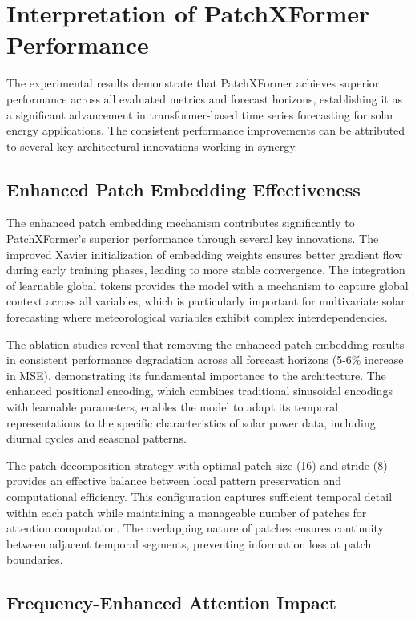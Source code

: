 \documentclass[12pt]{uomthesis}
\begin{document}
\section{Interpretation of PatchXFormer Performance}

The experimental results demonstrate that PatchXFormer achieves superior performance across all evaluated metrics and forecast horizons, establishing it as a significant advancement in transformer-based time series forecasting for solar energy applications. The consistent performance improvements can be attributed to several key architectural innovations working in synergy.

\subsection{Enhanced Patch Embedding Effectiveness}

The enhanced patch embedding mechanism contributes significantly to PatchXFormer's superior performance through several key innovations. The improved Xavier initialization of embedding weights ensures better gradient flow during early training phases, leading to more stable convergence. The integration of learnable global tokens provides the model with a mechanism to capture global context across all variables, which is particularly important for multivariate solar forecasting where meteorological variables exhibit complex interdependencies.

The ablation studies reveal that removing the enhanced patch embedding results in consistent performance degradation across all forecast horizons (5-6\% increase in MSE), demonstrating its fundamental importance to the architecture. The enhanced positional encoding, which combines traditional sinusoidal encodings with learnable parameters, enables the model to adapt its temporal representations to the specific characteristics of solar power data, including diurnal cycles and seasonal patterns.

The patch decomposition strategy with optimal patch size (16) and stride (8) provides an effective balance between local pattern preservation and computational efficiency. This configuration captures sufficient temporal detail within each patch while maintaining a manageable number of patches for attention computation. The overlapping nature of patches ensures continuity between adjacent temporal segments, preventing information loss at patch boundaries.

\subsection{Frequency-Enhanced Attention Impact}
\end{document}
